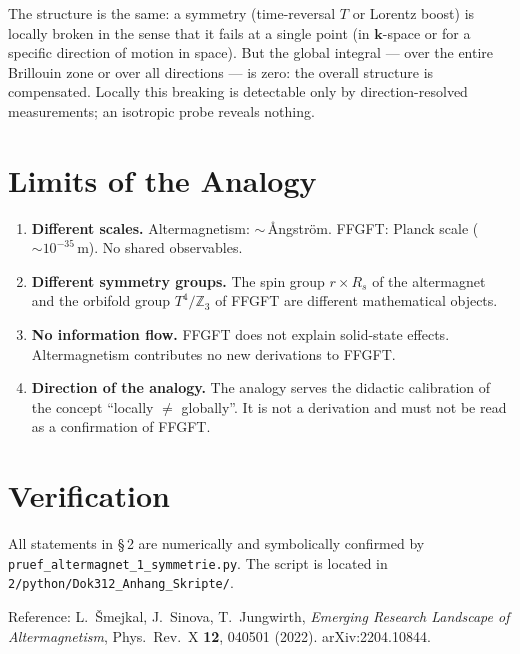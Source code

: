 The structure is the same: a symmetry (time-reversal $T$ or Lorentz
boost) is locally broken in the sense that it fails at a single point
(in $\mathbf{k}$-space or for a specific direction of motion in space).
But the global integral — over the entire Brillouin zone or over all
directions — is zero: the overall structure is compensated. Locally
this breaking is detectable only by direction-resolved measurements;
an isotropic probe reveals nothing.

\section{Limits of the Analogy \E}

\begin{tcolorbox}[warnbox,title={Restrictions — explicit}]
\begin{enumerate}
  \item \textbf{Different scales.} Altermagnetism: $\sim$\,\AA ngström.
    FFGFT: Planck scale ($\sim 10^{-35}$\,m). No shared observables.
  \item \textbf{Different symmetry groups.} The spin group $r \times R_s$
    of the altermagnet and the orbifold group $T^4/\mathbb{Z}_3$
    of FFGFT are different mathematical objects.
  \item \textbf{No information flow.} FFGFT does not explain solid-state
    effects. Altermagnetism contributes no new derivations to FFGFT.
  \item \textbf{Direction of the analogy.} The analogy serves the
    didactic calibration of the concept \enquote{locally $\neq$ globally}.
    It is not a derivation and must not be read as a confirmation of FFGFT.
\end{enumerate}
\end{tcolorbox}

\section{Verification}

All statements in §\,2 are numerically and symbolically confirmed by
\texttt{pruef\_altermagnet\_1\_symmetrie.py}. The script is located in
\texttt{2/python/Dok312\_Anhang\_Skripte/}.

Reference: L.\ Šmejkal, J.\ Sinova, T.\ Jungwirth,
\textit{Emerging Research Landscape of Altermagnetism},
Phys.\ Rev.\ X \textbf{12}, 040501 (2022).
arXiv:2204.10844.
